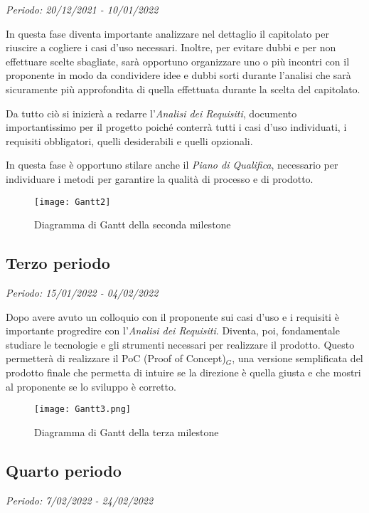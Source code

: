 \textit{Periodo: 20/12/2021 - 10/01/2022}

In questa fase diventa importante analizzare nel dettaglio il capitolato per riuscire a
cogliere i casi d'uso necessari. Inoltre, per evitare dubbi e per non effettuare
scelte sbagliate, sarà opportuno organizzare uno o più incontri con il proponente in modo da
condividere idee e dubbi sorti durante l'analisi che sarà sicuramente più approfondita di quella
effettuata durante la scelta del capitolato.
\par Da tutto ciò si inizierà a redarre l'\textit{Analisi dei Requisiti}, documento importantissimo per il progetto poiché
conterrà tutti i casi d'uso individuati, i requisiti obbligatori, quelli desiderabili e quelli opzionali.
\par In questa fase è opportuno stilare anche il \textit{Piano di Qualifica}, necessario per individuare
i metodi per garantire la qualità di processo e di prodotto.

\begin{figure}[!ht]
    \texttt{[image: Gantt2]}
    \caption{Diagramma di Gantt della seconda milestone}
\end{figure}

\subsection{Terzo periodo}

\textit{Periodo: 15/01/2022 - 04/02/2022}

Dopo avere avuto un colloquio con il proponente sui casi d'uso e i requisiti è importante progredire con
l'\textit{Analisi dei Requisiti}. Diventa, poi, fondamentale studiare le tecnologie e gli strumenti necessari
per realizzare il prodotto. Questo permetterà di realizzare il PoC (Proof of Concept)$_G$, una versione semplificata
del prodotto finale che permetta di intuire se la direzione è quella giusta e che mostri al proponente se lo
sviluppo è corretto.

\begin{figure}[!ht]
    \texttt{[image: Gantt3.png]}
    \caption{Diagramma di Gantt della terza milestone}
\end{figure}


\subsection{Quarto periodo}
\textit{Periodo: 7/02/2022 - 24/02/2022}

